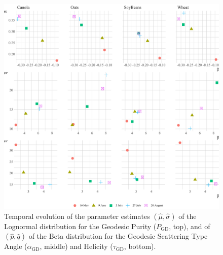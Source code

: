 \documentclass[journal]{IEEEtran}
\begin{document}
\begin{figure}
\centering
\includegraphics[width=.7\linewidth]{TemporalIndexes}
\caption{Temporal evolution of the parameter estimates $(\widehat\mu,\widehat\sigma)$ of the Lognormal distribution for the Geodesic Purity ($P_{\text{GD}}$, top), and of $(\widehat p,\widehat q)$ of the Beta distribution for the Geodesic Scattering Type Angle ($\alpha_{\text{GD}}$, middle) and Helicity ($\tau_{\text{GD}}$, bottom).}\label{fig:TemporalIndexes}
\end{figure}
%
%

 

\end{document}
